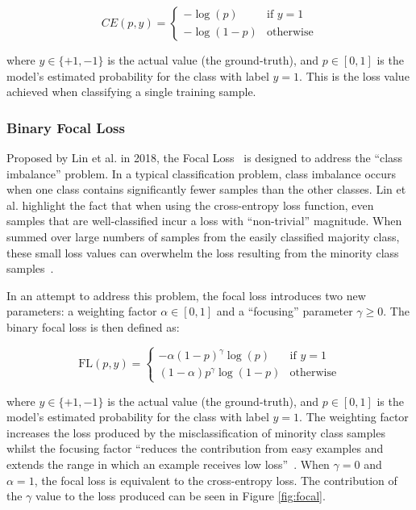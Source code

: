 \begin{equation}
    CE(p, y) = 
    \begin{cases}
        -\log(p) & \text{if } y = 1\\
        -\log(1 - p) & \text{otherwise}
    \end{cases}
\end{equation}

where $y \in \{+1, -1\}$ is the actual value (the ground-truth), and $p \in [0, 1]$ is the model's estimated probability for the class with label $y = 1$. This is the loss value achieved when classifying a single training sample.

\subsubsection{Binary Focal Loss}

Proposed by Lin et al. in 2018, the Focal Loss~\cite{focalloss} is designed to address the ``class imbalance'' problem. In a typical classification problem, class imbalance occurs when one class contains significantly fewer samples than the other classes. Lin et al. highlight the fact that when using the cross-entropy loss function, even samples that are well-classified incur a loss with ``non-trivial'' magnitude. When summed over large numbers of samples from the easily classified majority class, these small loss values can overwhelm the loss resulting from the minority class samples~\cite{focalloss}.

In an attempt to address this problem, the focal loss introduces two new parameters: a weighting factor $\alpha \in [0, 1]$ and a ``focusing'' parameter $\gamma \geq 0$.
The binary focal loss is then defined as:

\begin{equation}
    \text{FL}(p, y) = 
    \begin{cases}
        -\alpha(1 - p)^{\gamma} \log (p) & \text{if } y = 1\\
        (1 - \alpha)p^{\gamma} \log (1 - p) & \text{otherwise}
    \end{cases}
\end{equation}

where $y \in \{+1, -1\}$ is the actual value (the ground-truth), and $p \in [0, 1]$ is the model's estimated probability for the class with label $y = 1$. The weighting factor increases the loss produced by the misclassification of minority class samples whilst the focusing factor ``reduces the contribution from easy examples and extends the range in which an example receives low loss''~\cite{focalloss}. When $\gamma = 0$ and $\alpha = 1$, the focal loss is equivalent to the cross-entropy loss. The contribution of the $\gamma$ value to the loss produced can be seen in Figure \ref{fig:focal}.


